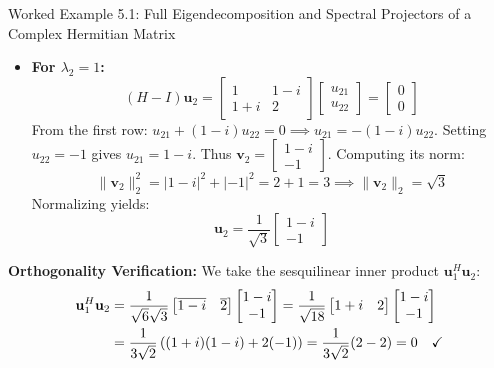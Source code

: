\begin{examplebox}{Worked Example 5.1: Full Eigendecomposition and Spectral Projectors of a Complex Hermitian Matrix}
\begin{itemize}
    \item \textbf{For $\lambda_2 = 1$:}
    \begin{equation}
    (H - I)\mathbf{u}_2 = \begin{bmatrix} 1 & 1 - i \\ 1 + i & 2 \end{bmatrix} \begin{bmatrix} u_{21} \\ u_{22} \end{bmatrix} = \begin{bmatrix} 0 \\ 0 \end{bmatrix}
    \end{equation}
    From the first row: $u_{21} + (1 - i)u_{22} = 0 \implies u_{21} = -(1 - i)u_{22}$.
    Setting $u_{22} = -1$ gives $u_{21} = 1 - i$. Thus $\mathbf{v}_2 = \begin{bmatrix} 1 - i \\ -1 \end{bmatrix}$.
    Computing its norm:
    \begin{equation}
    \|\mathbf{v}_2\|_2^2 = |1 - i|^2 + |-1|^2 = 2 + 1 = 3 \implies \|\mathbf{v}_2\|_2 = \sqrt{3}
    \end{equation}
    Normalizing yields:
    \begin{equation}
    \mathbf{u}_2 = \frac{1}{\sqrt{3}} \begin{bmatrix} 1 - i \\ -1 \end{bmatrix}
    \end{equation}
\end{itemize}

\textbf{Orthogonality Verification:}
We take the sesquilinear inner product $\mathbf{u}_1^H \mathbf{u}_2$:
\begin{align}
\mathbf{u}_1^H \mathbf{u}_2 &= \frac{1}{\sqrt{6}\sqrt{3}} \begin{bmatrix} \overline{1 - i} & \overline{2} \end{bmatrix} \begin{bmatrix} 1 - i \\ -1 \end{bmatrix} = \frac{1}{\sqrt{18}} \begin{bmatrix} 1 + i & 2 \end{bmatrix} \begin{bmatrix} 1 - i \\ -1 \end{bmatrix} \notag \\
&= \frac{1}{3\sqrt{2}} \left( (1 + i)(1 - i) + 2(-1) \right) = \frac{1}{3\sqrt{2}} (2 - 2) = 0 \quad \checkmark
\end{align}


\end{examplebox}
